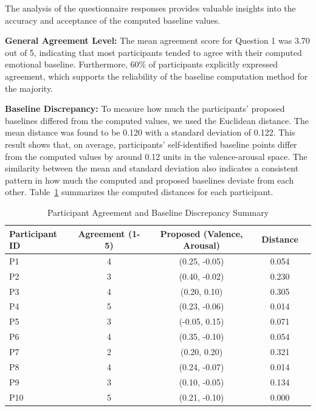 The analysis of the questionnaire responses provides valuable insights into the accuracy and acceptance of the computed baseline values. 

\textbf{General Agreement Level:} The mean agreement score for Question 1  was 3.70 out of 5, indicating that most participants tended to agree with their computed emotional baseline. Furthermore, 60\% of participants explicitly expressed agreement, which supports the reliability of the baseline computation method for the majority.

\textbf{Baseline Discrepancy:} To measure how much the participants’ proposed baselines differed from the computed values, we used the Euclidean distance.
The mean distance was found to be 0.120 with a standard deviation of 0.122. This result shows that, on average, participants' self-identified baseline points differ from the computed values by around 0.12 units in the valence-arousal space. The similarity between the mean and standard deviation also indicates a consistent pattern in how much the computed and proposed baselines deviate from each other. Table~\ref{tab:agreement_summary} summarizes the computed distances for each participant.

\begin{table}[H]
    \centering
    \caption{Participant Agreement and Baseline Discrepancy Summary}
    \begin{tabular}{lcccc}
    \toprule
    \textbf{Participant ID} & \textbf{Agreement (1-5)} & \textbf{Proposed (Valence, Arousal)} & \textbf{Distance} \\
    \midrule
    P1 & 4 & (0.25, -0.05) & 0.054 \\
    P2 & 3 & (0.40, -0.02) & 0.230 \\
    P3 & 4 & (0.20, 0.10) & 0.305 \\
    P4 & 5 & (0.23, -0.06) & 0.014 \\
    P5 & 3 & (-0.05, 0.15) & 0.071 \\
    P6 & 4 & (0.35, -0.10) & 0.054 \\
    P7 & 2 & (0.20, 0.20) & 0.321 \\
    P8 & 4 & (0.24, -0.07) & 0.014 \\
    P9 & 3 & (0.10, -0.05) & 0.134 \\
    P10 & 5 & (0.21, -0.10) & 0.000 \\
    \bottomrule
    \end{tabular}
    \label{tab:agreement_summary}
    \end{table}
    
